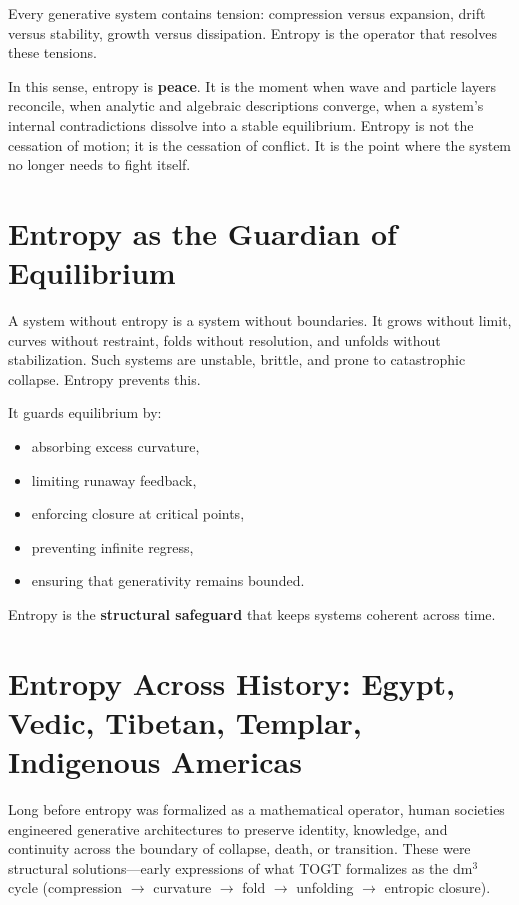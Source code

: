 \documentclass[14pt, twoside, openright]{book}
\theoremstyle{definition}
\theoremstyle{remark}
\begin{document}
Every generative system contains tension: compression versus expansion, drift
versus stability, growth versus dissipation. Entropy is the operator that
resolves these tensions.

In this sense, entropy is \textbf{peace}. It is the moment when wave and particle
layers reconcile, when analytic and algebraic descriptions converge, when a
system's internal contradictions dissolve into a stable equilibrium. Entropy is
not the cessation of motion; it is the cessation of conflict. It is the point
where the system no longer needs to fight itself.

\section{Entropy as the Guardian of Equilibrium}

A system without entropy is a system without boundaries. It grows without limit,
curves without restraint, folds without resolution, and unfolds without
stabilization. Such systems are unstable, brittle, and prone to catastrophic
collapse. Entropy prevents this.

It guards equilibrium by:

\begin{itemize}[leftmargin=2em]
  \item absorbing excess curvature,
  \item limiting runaway feedback,
  \item enforcing closure at critical points,
  \item preventing infinite regress,
  \item ensuring that generativity remains bounded.
\end{itemize}

Entropy is the \textbf{structural safeguard} that keeps systems coherent across
time.

\section{Entropy Across History: Egypt, Vedic, Tibetan, Templar, Indigenous Americas}

Long before entropy was formalized as a mathematical operator, human societies
engineered generative architectures to preserve identity, knowledge, and
continuity across the boundary of collapse, death, or transition. These were
structural solutions---early expressions of what TOGT formalizes as the dm$^{3}$
cycle (compression $\to$ curvature $\to$ fold $\to$ unfolding $\to$ entropic
closure).
\end{document}
